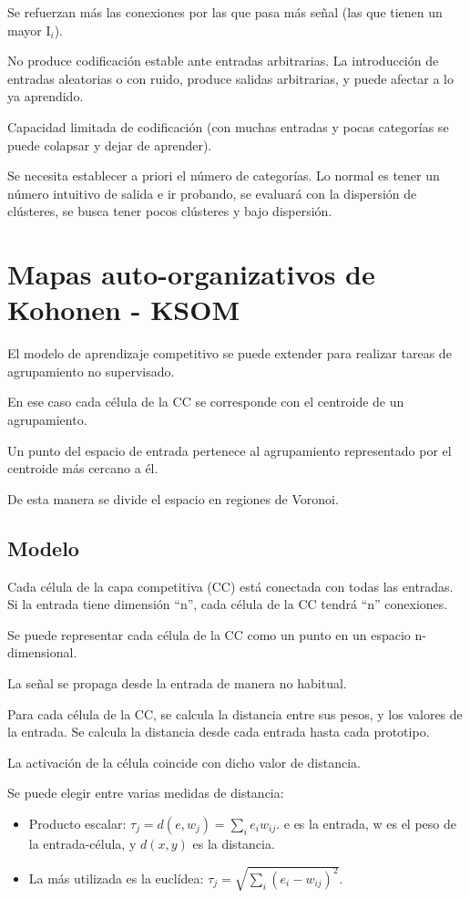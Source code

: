 \documentclass[12pt, twoside, openright]{report} %
\begin{document}
Se refuerzan más las conexiones por las que pasa más señal (las que tienen un mayor I$_i$).

No produce codificación estable ante entradas arbitrarias. La introducción de entradas aleatorias o con ruido, produce salidas arbitrarias, y puede afectar a lo ya aprendido.

Capacidad limitada de codificación (con muchas entradas y pocas categorías se puede colapsar y dejar de aprender).

Se necesita establecer a priori el número de categorías. Lo normal es tener un número intuitivo de salida e ir probando, se evaluará con la dispersión de clústeres, se busca tener pocos clústeres y bajo dispersión.

\section{Mapas auto-organizativos de Kohonen - KSOM}
El modelo de aprendizaje competitivo se puede extender para realizar tareas de agrupamiento no supervisado.

En ese caso cada célula de la CC se corresponde con el centroide de un agrupamiento.

Un punto del espacio de entrada pertenece al agrupamiento representado por el centroide más cercano a él.

De esta manera se divide el espacio en regiones de Voronoi.

\subsection{Modelo}
Cada célula de la capa competitiva (CC) está conectada con todas las entradas. Si la entrada tiene dimensión “n”, cada célula de la CC tendrá “n” conexiones.

Se puede representar cada célula de la CC como un punto en un espacio n-dimensional.

La señal se propaga desde la entrada de manera no habitual.

Para cada célula de la CC, se calcula la distancia entre sus pesos, y los valores de la entrada. Se calcula la distancia desde cada entrada hasta cada prototipo.

La activación de la célula coincide con dicho valor de distancia.

Se puede elegir entre varias medidas de distancia:
\begin{itemize}
	\item Producto escalar: $\tau_j=d(e,w_j)=\sum_i e_iw_{ij}$. e es la entrada, w es el peso de la entrada-célula, y $d(x, y)$ es la distancia.
	\item La más utilizada es la euclídea: $\tau_j= \sqrt{\sum_i (e_i - w_{ij})^2}$.
\end{itemize}
\end{document}
